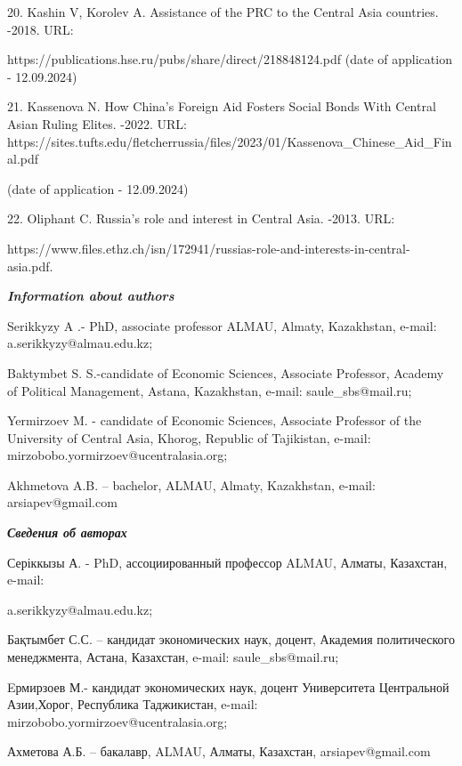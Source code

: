\begin{noparindent}
20.
Kashin V, Korolev A. Assistance of the PRC to the Central Asia
countries. -2018. URL:

https://publications.hse.ru/pubs/share/direct/218848124.pdf (date of
application - 12.09.2024)

21.
Kassenova N. How China's Foreign Aid Fosters Social Bonds With Central
Asian Ruling Elites. -2022. URL:
https://sites.tufts.edu/fletcherrussia/files/2023/01/Kassenova\_Chinese\_Aid\_Final.pdf

(date of application - 12.09.2024)

22.
Oliphant C. Russia's role and interest in Central Asia. -2013. URL:

https://www.files.ethz.ch/isn/172941/russias-role-and-interests-in-central-asia.pdf.
\end{noparindent}

\emph{{\bfseries Information about authors}}

\begin{noparindent}
Serikkyzy A .- PhD, associate professor ALMAU, Almaty, Kazakhstan,
e-mail: a.serikkyzy@almau.edu.kz;

Baktymbet S. S.-candidate of Economic Sciences, Associate Professor,
Academy of Political Management, Astana, Kazakhstan, e-mail:
saule\_sbs@mail.ru;

Yermirzoev M. - candidate of Economic Sciences, Associate Professor of
the University of Central Asia, Khorog, Republic of Tajikistan, e-mail:
mirzobobo.yormirzoev@ucentralasia.org;

Akhmetova A.B. -- bachelor, ALMAU, Almaty, Kazakhstan, e-mail:
arsiapev@gmail.com
\end{noparindent}

\emph{{\bfseries Сведения об авторах}}

\begin{noparindent}
Серіккызы А. - PhD, ассоциированный профессор ALMAU, Алматы, Казахстан,
e-mail:

a.serikkyzy@almau.edu.kz;

Бақтымбет С.С. -- кандидат экономических наук, доцент, Академия
политического менеджмента, Астана, Казахстан, e-mail:
saule\_sbs@mail.ru;

Eрмирзоев М.- кандидат экономических наук, доцент Университета
Центральной Азии,Хорог, Республика Таджикистан, e-mail:
mirzobobo.yormirzoev@ucentralasia.org;

Ахметова А.Б. -- бакалавр, ALMAU, Алматы, Казахстан, arsiapev@gmail.com
\end{noparindent}
